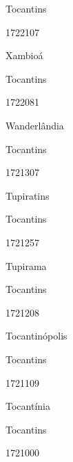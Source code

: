 \documentclass[
  letterpaper,
]{report}
\begin{document}
\n    

\n      

Tocantins

\n      

1722107

\n      

Xambioá

\n    

\n    

\n      

Tocantins

\n      

1722081

\n      

Wanderlândia

\n    

\n    

\n      

Tocantins

\n      

1721307

\n      

Tupiratins

\n    

\n    

\n      

Tocantins

\n      

1721257

\n      

Tupirama

\n    

\n    

\n      

Tocantins

\n      

1721208

\n      

Tocantinópolis

\n    

\n    

\n      

Tocantins

\n      

1721109

\n      

Tocantínia

\n    

\n    

\n      

Tocantins

\n      

1721000
\end{document}
